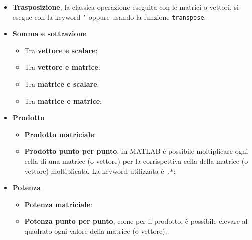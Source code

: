 \begin{itemize}
    \item \textbf{Trasposizione}, la classica operazione eseguita con le matrici o vettori, si esegue con la keyword \texttt{'} oppure usando la funzione \texttt{transpose}:
    

    \item \textbf{Somma e sottrazione}
    \begin{itemize}
        \item Tra \textbf{vettore e scalare}:
        

        \item Tra \textbf{vettore e matrice}:
        

        \item Tra \textbf{matrice e scalare}:
        

        \item Tra \textbf{matrice e matrice}:
        
    \end{itemize}

    \item \textbf{Prodotto}
    \begin{itemize}
        \item \textbf{Prodotto matriciale}:
        

        \item \textbf{Prodotto punto per punto}, in MATLAB è possibile moltiplicare ogni cella di una matrice (o vettore) per la corrispettiva cella della matrice (o vettore) moltiplicata. La keyword utilizzata è \texttt{.*}:
        
    \end{itemize}

    \item \textbf{Potenza}
    \begin{itemize}
        \item \textbf{Potenza matriciale}:
        

        \item \textbf{Potenza punto per punto}, come per il prodotto, è possibile elevare al quadrato ogni valore della matrice (o vettore):
        
    \end{itemize}
\end{itemize}

